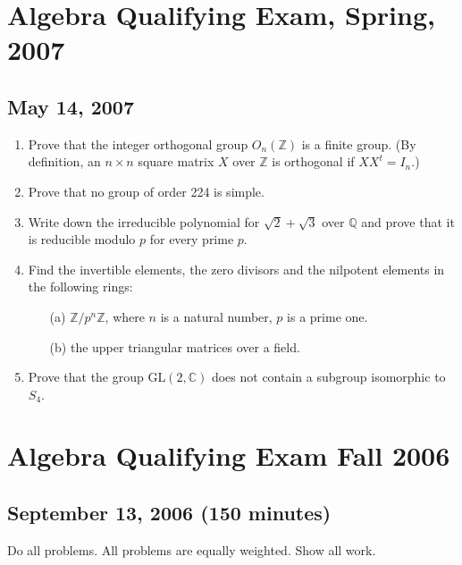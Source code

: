\documentclass{article}
\begin{document}
\section*{Algebra Qualifying Exam, Spring, 2007}
\subsection*{May 14, 2007}

\begin{enumerate}
    \item Prove that the integer orthogonal group \(O_n(\mathbb{Z})\) is a finite group. (By definition, an \(n \times n\) square matrix \(X\) over \(\mathbb{Z}\) is orthogonal if \(XX^t = I_n\).)

    \item Prove that no group of order 224 is simple.

    \item Write down the irreducible polynomial for \(\sqrt{2} + \sqrt{3}\) over \(\mathbb{Q}\) and prove that it is reducible modulo \(p\) for every prime \(p\).

    \item Find the invertible elements, the zero divisors and the nilpotent elements in the following rings:
    \begin{itemize}
        \item[(a)] \(\mathbb{Z}/p^n\mathbb{Z}\), where \(n\) is a natural number, \(p\) is a prime one.
        \item[(b)] the upper triangular matrices over a field.
    \end{itemize}

    \item Prove that the group \(\text{GL}(2,\mathbb{C})\) does not contain a subgroup isomorphic to \(S_4\).
\end{enumerate}

\section*{Algebra Qualifying Exam Fall 2006}
\subsection*{September 13, 2006 (150 minutes)}

Do all problems. All problems are equally weighted. Show all work.
\end{document}
